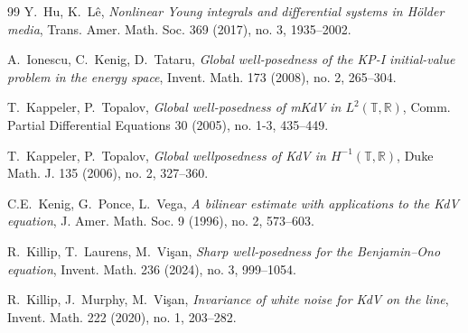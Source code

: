\documentclass[letterpaper, 11pt,  reqno]{amsart}
\newcommand{\1}{\hspace{0.5mm}\text{I}\hspace{0.5mm}}
\newcommand{\R}{\mathbb{R}}
\newcommand{\T}{\mathbb{T}}
\numberwithin{equation}{section}
\numberwithin{theorem}{section}
\begin{document}
\begin{thebibliography}{99}
Y.~Hu, K.~L\^e, 
{\it Nonlinear Young integrals and differential systems in H\"older media},
 Trans. Amer. Math. Soc. 369 (2017), no. 3, 1935--2002. 


%
%
%
%
%
%
%



A.~Ionescu, C.~Kenig, D.~Tataru, 
{\it Global well-posedness of the KP-I initial-value problem in the energy space}, 
Invent. Math. 173 (2008), no. 2, 265--304.



T.~Kappeler, P.~Topalov,
{\it Global well-posedness of mKdV in $L^2(\T,\R)$}, 
Comm. Partial Differential Equations 30 (2005), no. 1-3, 435--449. 



T.~Kappeler, P.~Topalov,
{\it Global wellposedness of KdV in $H^{-1}(\T, \R)$},
Duke Math. J. 135 (2006), no. 2, 327--360.



%
%
%




C.E.~Kenig, G.~Ponce, L.~Vega,
{\it A bilinear estimate with applications to the KdV equation},
J. Amer. Math. Soc. 9 (1996), no. 2, 573--603.






R.~Killip, T.~Laurens, M.~Vi\c{s}an, 
{\it Sharp well-posedness for the Benjamin--Ono equation}, 
Invent. Math. 236 (2024), no. 3, 999--1054.



R.~Killip, J.~Murphy,  M.~Vi\c{s}an, 
{\it  Invariance of white noise for KdV on the line}, Invent. Math. 222 (2020), no. 1, 203--282.



\end{thebibliography}
\end{document}
